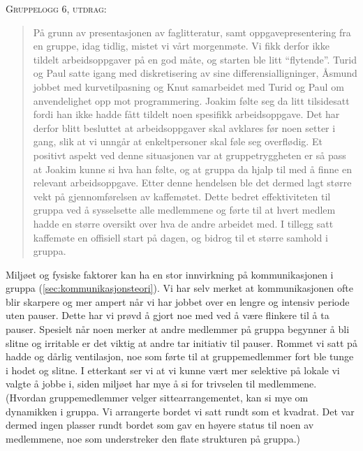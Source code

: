 \begin{centering}
\textsc{Gruppelogg 6, utdrag:}
\end{centering}
\begin{quote}
På grunn av presentasjonen av faglitteratur, samt oppgavepresentering fra en gruppe,
idag tidlig, mistet vi vårt morgenmøte. Vi fikk derfor ikke tildelt arbeidsoppgaver på 
en god måte, og starten ble litt ``flytende''. Turid og Paul satte igang med diskretisering
av sine differensialligninger, Åsmund jobbet med kurvetilpasning og Knut samarbeidet
med Turid og Paul om anvendelighet opp mot programmering. Joakim følte seg da litt
tilsidesatt fordi han ikke hadde fått tildelt noen spesifikk arbeidsoppgave. Det har derfor
blitt besluttet at arbeidsoppgaver skal avklares før noen setter i gang, slik at vi unngår at                                           
enkeltpersoner skal føle seg overflødig. Et positivt aspekt ved denne situasjonen var at
gruppetryggheten er så pass at Joakim kunne si hva han følte, og at gruppa da hjalp til
med å finne en relevant arbeidsoppgave. Etter denne hendelsen ble det dermed lagt større vekt 
på gjennomførelsen av kaffemøtet. Dette bedret effektiviteten til gruppa ved å sysselsette 
alle medlemmene og førte til at hvert medlem hadde en større oversikt over hva de andre arbeidet
med. I tillegg satt kaffemøte en offisiell start på dagen, og bidrog til et større samhold i gruppa.
\end{quote}


Miljøet og fysiske faktorer kan ha en stor innvirkning på kommunikasjonen i
gruppa (\ref{sec:kommunikasjonsteori}). Vi har selv
merket at kommunikasjonen ofte blir skarpere og mer ampert når vi har jobbet over en lengre og
intensiv periode uten pauser. Dette har vi prøvd å gjort noe med ved å være flinkere til å ta
pauser. Spesielt når noen merker at andre medlemmer på gruppa begynner å bli slitne og irritable
er det viktig at andre tar initiativ til pauser. Rommet vi satt på hadde og dårlig ventilasjon,
noe som førte til at gruppemedlemmer fort ble tunge i hodet og slitne. I etterkant ser vi at
vi kunne vært mer selektive på lokale vi valgte å jobbe i, siden miljøet har mye å si for 
trivselen til medlemmene. (Hvordan gruppemedlemmer velger sittearrangementet, kan si mye om 
dynamikken i gruppa. Vi arrangerte bordet vi satt rundt som et kvadrat. Det var dermed ingen
plasser rundt bordet som gav en høyere status til noen av medlemmene, noe som understreker den 
flate strukturen på gruppa.)

